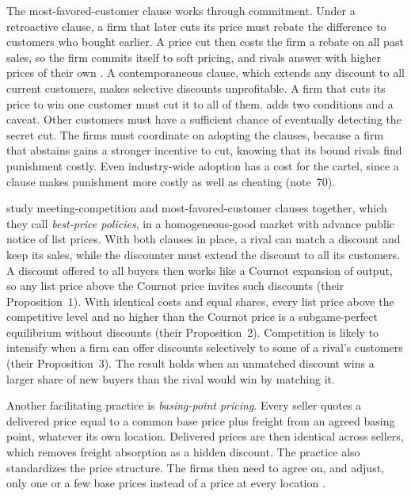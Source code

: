 The most-favored-customer clause works through commitment. Under a retroactive clause, a firm that later cuts
its price must rebate the difference to customers who bought earlier. A price cut then costs the firm a rebate on
all past sales, so the firm commits itself to soft pricing, and rivals answer with higher prices of their own
\citep{Cooper1986}. A contemporaneous clause, which extends any discount to all current customers, makes selective
discounts unprofitable. A firm that cuts its price to win one customer must cut it to all of them.
\citet[p.~284]{Kaplow2013} adds two conditions and a caveat. Other customers must have a sufficient chance of eventually
detecting the secret cut. The firms must coordinate on adopting the clauses, because a firm that abstains gains a
stronger incentive to cut, knowing that its bound rivals find punishment costly. Even industry-wide adoption has a
cost for the cartel, since a clause makes punishment more costly as well as cheating (note~70).

\citet[pp.~188--194]{HoltScheffman1987} study meeting-competition and most-favored-customer clauses together, which
they call \emph{best-price policies}, in a homogeneous-good market with advance public notice of list prices. With
both clauses in place, a rival can match a discount and keep its sales, while the discounter must extend the discount
to all its customers. A discount offered to all buyers then works like a Cournot expansion of output, so any list
price above the Cournot price invites such discounts (their Proposition~1). With identical costs and equal shares,
every list price above the competitive level and no higher than the Cournot price is a subgame-perfect equilibrium
without discounts (their Proposition~2). Competition is likely to intensify when a firm can offer discounts
selectively to some of a rival's customers (their Proposition~3). The result holds when an unmatched discount wins a
larger share of new buyers than the rival would win by matching it.

Another facilitating practice is \emph{basing-point pricing}. Every seller quotes a delivered price equal to a
common base price plus freight from an agreed basing point, whatever its own location.
Delivered prices are then identical across sellers, which removes freight absorption as a hidden discount. The
practice also standardizes the price structure. The firms then need to agree on, and adjust, only one or a few base
prices instead of a price at every location \citep[p.~282]{Kaplow2013}.

